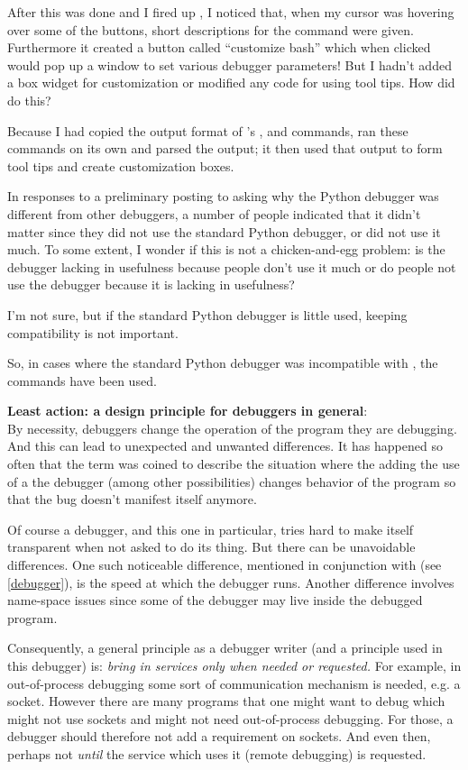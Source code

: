 After this was done and I fired up , I noticed that, when my
cursor was hovering over some of the buttons, short descriptions for
the command were given. Furthermore it created a button called
``customize bash'' which when clicked would pop up a window to set
various debugger parameters! But I hadn't added a box widget for
customization or modified any code for using tool tips. How did
 do this?

Because I had copied the output format of 's ,
 and  commands,  ran these commands on
its own and parsed the output; it then used that output to form tool
tips and create customization boxes.

In responses to a preliminary posting to 
asking why the Python debugger was different from other debuggers, a
number of people indicated that it didn't matter since they did not use
the standard Python debugger, or did not use it much.  To some extent,
I wonder if this is not a chicken-and-egg problem: is the debugger
lacking in usefulness because people don't use it much or do people
not use the debugger because it is lacking in usefulness?

I'm not sure, but if the standard Python debugger is little used,
keeping compatibility is not important.

So, in cases where the standard Python
debugger was incompatible with , the  commands
have been used.

{\bf Least action: a design principle for debuggers in general}:\\ By
necessity, debuggers change the operation of the program they are
debugging. And this can lead to unexpected and unwanted
differences. It has happened so often that the term
 was
coined to describe the situation where the adding the use of a the
debugger (among other possibilities) changes behavior of the program
so that the bug doesn't manifest itself anymore.

Of course a debugger, and this one in particular, tries hard to make
itself transparent when not asked to do its thing. But there can be
unavoidable differences. One such noticeable difference, mentioned in
conjunction with  (see \ref{debugger}), is the
speed at which the debugger runs. Another difference involves
name-space issues since some of the debugger may live inside the
debugged program.

Consequently, a general principle as a debugger writer (and a
principle used in this debugger) is: \emph{bring in services only when
needed or requested.}  For example, in out-of-process debugging some
sort of communication mechanism is needed, e.g. a socket. However
there are many programs that one might want to debug which might not
use sockets and might not need out-of-process debugging. For those, a
debugger should therefore not add a requirement on sockets.  And even
then, perhaps not \emph{until} the service which uses it (remote
debugging) is requested.

